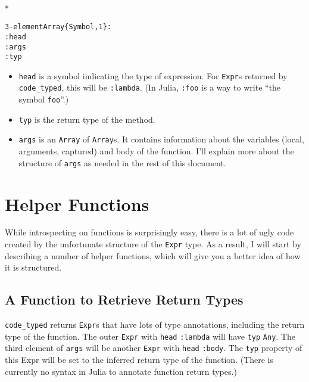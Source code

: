 \documentclass[letterpaper,10pt,english]{/Users/danluu/anaconda/lib/python2.7/site-packages/sphinx/texinputs/sphinxhowto}
\def\smaller{\fontsize{9.5pt}{9.5pt}\selectfont}
\newenvironment{InvisibleVerbatim}
        {\begin{mdframed}[leftmargin=0.1\linewidth,innerleftmargin=3pt,innerrightmargin=3pt, userdefinedwidth=1\linewidth, linewidth=0pt, linecolor=white, usetwoside=false]}
        {\end{mdframed}}
\begin{document}
        

            
                \makebox[0.1\linewidth]{\smaller\hfill\tt\color{nbframe-out-prompt}Out\hspace{4pt}{[}4{]}:\hspace{4pt}}\\*
                \vspace{-2.55\baselineskip}\begin{InvisibleVerbatim}
                \vspace{-0.5\baselineskip}
\begin{alltt}3-element Array\{Symbol,1\}:
 :head
 :args
 :typ\end{alltt}

            \end{InvisibleVerbatim}
            
        
    
\begin{itemize}
\itemsep1pt\parskip0pt
\item
  \texttt{head} is a symbol indicating the type of expression. For
  \texttt{Expr}s returned by \texttt{code\_typed}, this will be
  \texttt{:lambda}. (In Julia, \texttt{:foo} is a way to write ``the
  symbol \texttt{foo}''.)
\item
  \texttt{typ} is the return type of the method.
\item
  \texttt{args} is an \texttt{Array} of \texttt{Array}s. It contains
  information about the variables (local, arguments, captured) and body
  of the function. I'll explain more about the structure of
  \texttt{args} as needed in the rest of this document.
\end{itemize}\section{Helper Functions}While introspecting on functions is surprisingly easy, there is a lot of
ugly code created by the unfortunate structure of the \texttt{Expr}
type. As a result, I will start by describing a number of helper
functions, which will give you a better idea of how it is structured.\subsection{A Function to Retrieve Return Types}\texttt{code\_typed} returns \texttt{Expr}s that have lots of type
annotations, including the return type of the function. The outer
\texttt{Expr} with \texttt{head} \texttt{:lambda} will have \texttt{typ}
\texttt{Any}. The third element of \texttt{args} will be another
\texttt{Expr} with \texttt{head} \texttt{:body}. The \texttt{typ}
property of this Expr will be set to the inferred return type of the
function. (There is currently no syntax in Julia to annotate function
return types.)
\end{document}
